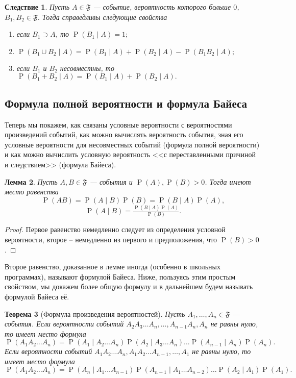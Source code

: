 \documentclass[12pt]{article}
\newtheorem{theorem}{Теорема}
\newtheorem{lemma}[theorem]{Лемма}
\newtheorem{corollary}[theorem]{Следствие}
\numberwithin{theorem}{section}
\theoremstyle{definition}
\newcommand{\prob}{\operatorname{P}}
\newcommand{\events}{\mathfrak{F}}
\begin{document}
	\begin{corollary}
		Пусть $ A \in \events $ --- событие, вероятность которого больше $ 0 $, $ B_1, B_2 \in \events $.
		Тогда справедливы следующие свойства
		\begin{enumerate}
			\item если $ B_1 \supset A $, то $ \prob(B_1 \mid A) = 1; $
			\item $ \prob(B_1 \cup B_2 \mid A) = \prob(B_1 \mid A) + \prob(B_2 \mid A) - \prob(B_1B_2 \mid A); $
			\item если $ B_1 $ и $ B_2 $ несовместны, то $ \prob(B_1 + B_2 \mid A) = \prob(B_1 \mid A) + \prob(B_2 \mid A). $
		\end{enumerate}
	\end{corollary}
	
	\subsection{Формула полной вероятности и формула Байеса}
	
	Теперь мы покажем, как связаны условные вероятности с вероятностями произведений событий, 
	как можно вычислять вероятность события, зная его условные вероятности для несовместных событий (формула полной вероятности)
	и как можно вычислить условную вероятность <<с переставленными причиной и следствием>> (формула Байеса).
	
	\begin{lemma} \label{cond prob}
		Пусть $ A, B \in \events $ --- события и $ \prob(A), \prob(B) > 0 $.
		Тогда имеют место равенства
		$$ \prob(AB) = \prob(A \mid B)\prob(B) = \prob(B \mid A)\prob(A), $$
		$$ \prob(A \mid B) = \tfrac{\prob(B \mid A)\prob(A)}{\prob(B)}. $$
	\end{lemma}
	
	\begin{proof}
		Первое равенство немедленно следует из определения условной вероятности, второе -- немедленно из первого
		и предположения, что $ \prob(B) > 0 $.
	\end{proof}
	
	Второе равенство, доказанное в лемме иногда (особенно в школьных программах), называют формулой Байеса.
	Ниже, пользуясь этим простым свойством, мы докажем более общую формулу и в дальнейшем будем называть формулой Байеса её.
	
	\begin{theorem}[Формула произведения вероятностей] \label{multiplication law}
		Пусть $ A_1, \ldots, A_n \in \events $ --- события.
		Если вероятности событий $ A_2A_3\ldots A_n, \ldots, A_{n - 1}A_n, A_n $ не равны нулю, то имеет место формула
		$$ \prob(A_1A_2\ldots A_n) = \prob(A_1 \mid A_2 \ldots A_n)\prob(A_2 \mid A_3 \ldots A_n) 
		\ldots \prob(A_{n - 1}\mid A_n)\prob(A_n). $$
		Если вероятности событий $ A_1A_2\ldots A_n, A_1A_2\ldots A_{n - 1}, \ldots, A_1 $ не равны нулю, то имеет место формула
		$$ \prob(A_1A_2\ldots A_n) = \prob(A_n \mid A_1\ldots A_{n-1})\prob(A_{n - 1} \mid A_1 \ldots A_{n - 2}) 
		\ldots \prob(A_{2}\mid A_1)\prob(A_1). $$
	\end{theorem}
	
\end{document}
